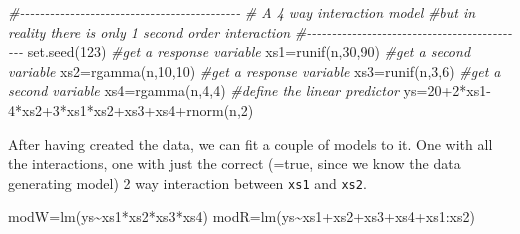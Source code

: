 \documentclass[
]{book}
\newenvironment{Shaded}{\begin{snugshade}}{\end{snugshade}}
\newcommand{\CommentTok}[1]{\textcolor[rgb]{0.56,0.35,0.01}{\textit{#1}}}
\newcommand{\DecValTok}[1]{\textcolor[rgb]{0.00,0.00,0.81}{#1}}
\newcommand{\FunctionTok}[1]{\textcolor[rgb]{0.00,0.00,0.00}{#1}}
\newcommand{\NormalTok}[1]{#1}
\newcommand{\OtherTok}[1]{\textcolor[rgb]{0.56,0.35,0.01}{#1}}
\newcommand{\SpecialCharTok}[1]{\textcolor[rgb]{0.00,0.00,0.00}{#1}}
\begin{document}
\begin{Shaded}
\begin{Highlighting}[]
\CommentTok{\#{-}{-}{-}{-}{-}{-}{-}{-}{-}{-}{-}{-}{-}{-}{-}{-}{-}{-}{-}{-}{-}{-}{-}{-}{-}{-}{-}{-}{-}{-}{-}{-}{-}{-}{-}{-}{-}{-}{-}{-}{-}{-}{-}{-}}
\CommentTok{\# A 4 way interaction model}
\CommentTok{\#but in reality there is only 1 second order interaction}
\CommentTok{\#{-}{-}{-}{-}{-}{-}{-}{-}{-}{-}{-}{-}{-}{-}{-}{-}{-}{-}{-}{-}{-}{-}{-}{-}{-}{-}{-}{-}{-}{-}{-}{-}{-}{-}{-}{-}{-}{-}{-}{-}{-}{-}{-}{-}}
\FunctionTok{set.seed}\NormalTok{(}\DecValTok{123}\NormalTok{)}
\CommentTok{\#get a response variable}
\NormalTok{xs1}\OtherTok{=}\FunctionTok{runif}\NormalTok{(n,}\DecValTok{30}\NormalTok{,}\DecValTok{90}\NormalTok{)}
\CommentTok{\#get a second variable}
\NormalTok{xs2}\OtherTok{=}\FunctionTok{rgamma}\NormalTok{(n,}\DecValTok{10}\NormalTok{,}\DecValTok{10}\NormalTok{)}
\CommentTok{\#get a response variable}
\NormalTok{xs3}\OtherTok{=}\FunctionTok{runif}\NormalTok{(n,}\DecValTok{3}\NormalTok{,}\DecValTok{6}\NormalTok{)}
\CommentTok{\#get a second variable}
\NormalTok{xs4}\OtherTok{=}\FunctionTok{rgamma}\NormalTok{(n,}\DecValTok{4}\NormalTok{,}\DecValTok{4}\NormalTok{)}
\CommentTok{\#define the linear predictor}
\NormalTok{ys}\OtherTok{=}\DecValTok{20}\SpecialCharTok{+}\DecValTok{2}\SpecialCharTok{*}\NormalTok{xs1}\DecValTok{{-}4}\SpecialCharTok{*}\NormalTok{xs2}\SpecialCharTok{+}\DecValTok{3}\SpecialCharTok{*}\NormalTok{xs1}\SpecialCharTok{*}\NormalTok{xs2}\SpecialCharTok{+}\NormalTok{xs3}\SpecialCharTok{+}\NormalTok{xs4}\SpecialCharTok{+}\FunctionTok{rnorm}\NormalTok{(n,}\DecValTok{2}\NormalTok{)}
\end{Highlighting}
\end{Shaded}

After having created the data, we can fit a couple of models to it. One with all the interactions, one with just the correct (=true, since we know the data generating model) 2 way interaction between \texttt{xs1} and \texttt{xs2}.

\begin{Shaded}
\begin{Highlighting}[]
\NormalTok{modW}\OtherTok{=}\FunctionTok{lm}\NormalTok{(ys}\SpecialCharTok{\textasciitilde{}}\NormalTok{xs1}\SpecialCharTok{*}\NormalTok{xs2}\SpecialCharTok{*}\NormalTok{xs3}\SpecialCharTok{*}\NormalTok{xs4)}
\NormalTok{modR}\OtherTok{=}\FunctionTok{lm}\NormalTok{(ys}\SpecialCharTok{\textasciitilde{}}\NormalTok{xs1}\SpecialCharTok{+}\NormalTok{xs2}\SpecialCharTok{+}\NormalTok{xs3}\SpecialCharTok{+}\NormalTok{xs4}\SpecialCharTok{+}\NormalTok{xs1}\SpecialCharTok{:}\NormalTok{xs2)}
\end{Highlighting}
\end{Shaded}
\end{document}

